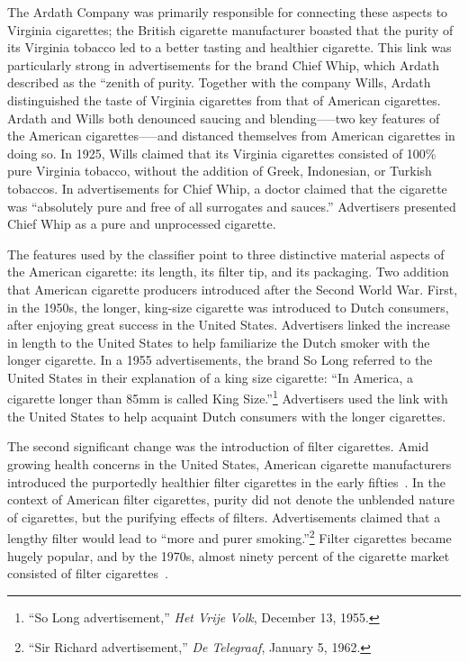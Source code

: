 \documentclass[USenglish]{article}
\begin{document}
The Ardath Company was primarily responsible for connecting these aspects to Virginia cigarettes; the British cigarette manufacturer boasted that the purity of its Virginia tobacco led to a better tasting and healthier cigarette. This link was particularly strong in advertisements for the brand Chief Whip, which Ardath described as the ``zenith of purity. Together with the company Wills, Ardath distinguished the taste of Virginia cigarettes from that of American cigarettes. Ardath and Wills both denounced saucing and blending--—two key features of the American cigarettes—--and distanced themselves from American cigarettes in doing so. In 1925, Wills claimed that its Virginia cigarettes consisted of 100\% pure Virginia tobacco, without the addition of Greek, Indonesian, or Turkish tobaccos. In advertisements for Chief Whip, a doctor claimed that the cigarette was ``absolutely pure and free of all surrogates and sauces.'' Advertisers presented Chief Whip as a pure and unprocessed cigarette.

The features used by the classifier point to three distinctive material aspects of the American cigarette: its length, its filter tip, and its packaging. Two addition that American cigarette producers introduced after the Second World War. 
%
First, in the 1950s, the longer, king-size cigarette was introduced to Dutch consumers, after enjoying great success in the United States. Advertisers linked the increase in length to the United States to help familiarize the Dutch smoker with the longer cigarette. In a 1955 advertisements, the brand So Long referred to the United States in their explanation of a king size cigarette: ``In America, a cigarette longer than 85mm is called King Size.''\footnote{``So Long advertisement,'' \textit{Het Vrije Volk}, December 13, 1955.} Advertisers used the link with the United States to help acquaint Dutch consumers with the longer cigarettes.

The second significant change was the introduction of filter cigarettes. Amid growing health concerns in the United States, American cigarette manufacturers introduced the purportedly healthier filter cigarettes in the early fifties~\cite[244]{brandt_cigarette_2009}. In the context of American filter cigarettes, purity did not denote the unblended nature of cigarettes, but the purifying effects of filters. Advertisements claimed that a lengthy filter would lead to ``more and purer smoking.''\footnote{``Sir Richard advertisement,'' \textit{De Telegraaf}, January 5, 1962.} Filter cigarettes became hugely popular, and by the 1970s, almost ninety percent of the cigarette market consisted of filter cigarettes~\cite[244]{brandt_cigarette_2009}. 
\end{document}
